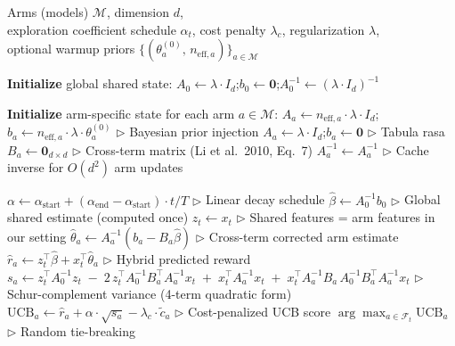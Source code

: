 
\begin{algorithm}[h]
\caption{Cost-Aware Hybrid LinUCB Expert (Algorithm 2, Li et al.\ 2010)}
\label{alg:linucb}
\begin{algorithmic}[1]

\REQUIRE Arms (models) $\mathcal{M}$, dimension $d$, \\
\hspace{2.5em} exploration coefficient schedule $\alpha_t$, cost penalty $\lambda_c$, regularization $\lambda$, \\
\hspace{2.5em} optional warmup priors $\{(\theta_a^{(0)},\, n_{\text{eff},a})\}_{a \in \mathcal{M}}$

\medskip
\STATE \textbf{Initialize} global shared state:
\STATE $A_0 \leftarrow \lambda \cdot I_d$;\quad $b_0 \leftarrow \mathbf{0}$;\quad $A_0^{-1} \leftarrow (\lambda \cdot I_d)^{-1}$

\medskip
\STATE \textbf{Initialize} arm-specific state for each arm $a \in \mathcal{M}$:
    \STATE $A_a \leftarrow n_{\text{eff},a} \cdot \lambda \cdot I_d$;\quad $b_a \leftarrow n_{\text{eff},a} \cdot \lambda \cdot \theta_a^{(0)}$ \hfill $\triangleright$ Bayesian prior injection
\ELSE
    \STATE $A_a \leftarrow \lambda \cdot I_d$;\quad $b_a \leftarrow \mathbf{0}$ \hfill $\triangleright$ Tabula rasa
\ENDIF
\STATE $B_a \leftarrow \mathbf{0}_{d \times d}$ \hfill $\triangleright$ Cross-term matrix (Li et al.\ 2010, Eq.~7)
\STATE $A_a^{-1} \leftarrow A_a^{-1}$ \hfill $\triangleright$ Cache inverse for $O(d^2)$ arm updates

\medskip
{}
    \STATE $\alpha \leftarrow \alpha_{\text{start}} + (\alpha_{\text{end}} - \alpha_{\text{start}}) \cdot t / T$ \hfill $\triangleright$ Linear decay schedule
    \STATE $\hat{\beta} \leftarrow A_0^{-1} b_0$ \hfill $\triangleright$ Global shared estimate (computed once)
    \STATE $z_t \leftarrow x_t$ \hfill $\triangleright$ Shared features = arm features in our setting
        \STATE $\hat{\theta}_a \leftarrow A_a^{-1} (b_a - B_a \hat{\beta})$ \hfill $\triangleright$ Cross-term corrected arm estimate
        \STATE $\hat{r}_a \leftarrow z_t^\top \hat{\beta} + x_t^\top \hat{\theta}_a$ \hfill $\triangleright$ Hybrid predicted reward
        \STATE $s_a \leftarrow z_t^\top A_0^{-1} z_t
                \;-\; 2\, z_t^\top A_0^{-1} B_a^\top A_a^{-1} x_t
                \;+\; x_t^\top A_a^{-1} x_t
                \;+\; x_t^\top A_a^{-1} B_a\, A_0^{-1} B_a^\top A_a^{-1} x_t$
        \hfill $\triangleright$ Schur-complement variance (4-term quadratic form)
        \STATE $\text{UCB}_a \leftarrow \hat{r}_a + \alpha \cdot \sqrt{s_a} - \lambda_c \cdot \tilde{c}_a$ \hfill $\triangleright$ Cost-penalized UCB score
    \ENDFOR
    \RETURN $\arg\max_{a \in \mathcal{F}_t} \text{UCB}_a$ \hfill $\triangleright$ Random tie-breaking
\ENDFUNCTION


\end{algorithmic}
\end{algorithm}
